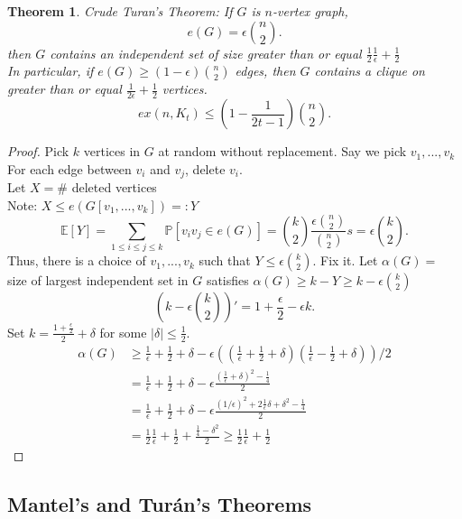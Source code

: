 \documentclass[a4paper]{article}
\newtheorem{thm}{Theorem}[section]
\begin{document}
\begin{thm}
    Crude Turan's Theorem: If $G$ is $n$-vertex graph, \[
    e(G)=\epsilon {n \choose 2}
    .\] then $G$ contains an independent set of size greater than or equal $\frac{1}{2}\frac{1}{\epsilon}+\frac{1}{2}$\\
    In particular, if $e(G)\geq (1-\epsilon){n \choose 2}$ edges, then $G$ contains a clique on greater than or equal $\frac{1}{2\epsilon}+\frac{1}{2}$ vertices.
    \[
    ex(n,K_t)\leq \left (1-\frac{1}{2t-1} \right ) {n \choose 2}
    .\]
\end{thm}
\begin{proof}
        Pick $k$ vertices in $G$ at random without replacement. Say we pick $v_1,...,v_k$\\
        For each edge between $v_i$ and $v_j$, delete $v_i$. \\
        Let $X=\#$ deleted vertices\\
        Note: $X\leq e(G[v_1,...,v_k])=:Y$
        \[
        \mathbb{E}[Y]=\sum_{1\leq i\leq j \leq k}\mathbb{P}[v_iv_j\in e(G)]={k \choose 2}\frac{\epsilon {n \choose 2}}{{n \choose 2}}s=\epsilon {k \choose 2}
        .\] 
        Thus, there is a choice of $v_1,...,v_k$ such that $Y\leq \epsilon {k \choose 2}.$ Fix it. 
        Let $\alpha(G)=$ size of largest independent set in $G$ satisfies $\alpha(G)\geq k-Y\geq k-\epsilon {k \choose 2}$
        \[
        \left (k-\epsilon {k \choose 2}\right )'=1+\frac{\epsilon}{2}-\epsilon k
        .\] 
        Set $k=\frac{1+\frac{\epsilon}{2}}{2}+\delta $ for some $|\delta|\leq \frac{1}{2}$.
        \begin{align*}
            \alpha(G)&\geq \frac{1}{\epsilon}+\frac{1}{2}+\delta -\epsilon \left (\left(\frac{1}{\epsilon}+\frac{1}{2}+\delta\right)\left(\frac{1}{\epsilon}-\frac{1}{2}+\delta\right)\right )/2\\
            &=\frac{1}{\epsilon}+\frac{1}{2}+\delta - \epsilon \frac{(\frac{1}{\epsilon}+\delta)^2-\frac{1}{4}}{2}\\
            &=\frac{1}{\epsilon}+\frac{1}{2}+\delta -\epsilon \frac{(1/\epsilon)^2+2 \frac{1}{\epsilon}\delta +\delta^2-\frac{1}{4}}{2}\\
            &=\frac{1}{2}\frac{1}{\epsilon} + \frac{1}{2}+\frac{\frac{1}{4}-\delta^2}{2}\geq \frac{1}{2}\frac{1}{\epsilon} + \frac{1}{2}
        \end{align*}
\end{proof}

\subsection{Mantel's and Turán's Theorems}
\end{document}

